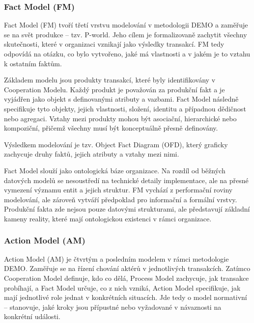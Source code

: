 
\subsubsection{Fact Model (FM)}
\label{sec:fact-model}

Fact Model (FM) tvoří třetí vrstvu modelování v metodologii DEMO a zaměřuje se na svět produkce – tzv. P-world. Jeho cílem je formalizovaně zachytit všechny skutečnosti, které v organizaci vznikají jako výsledky transakcí. FM tedy odpovídá na otázku, co bylo vytvořeno, jaké má vlastnosti a v jakém je to vztahu k ostatním faktům. \cite{Dietz2020}

Základem modelu jsou produkty transakcí, které byly identifikovány v Cooperation Modelu. Každý produkt je považován za produkční fakt a je vyjádřen jako objekt s definovanými atributy a vazbami. Fact Model následně specifikuje tyto objekty, jejich vlastnosti, složení, identitu a případnou dědičnost nebo agregaci. Vztahy mezi produkty mohou být asociační, hierarchické nebo kompoziční, přičemž všechny musí být konceptuálně přesně definovány. \cite{Dietz1999,Dietz2020}

Výsledkem modelování je tzv. Object Fact Diagram (OFD), který graficky zachycuje druhy faktů, jejich atributy a vztahy mezi nimi. \cite{Pergl2023DEMO_modely}

Fact Model slouží jako ontologická báze organizace. Na rozdíl od běžných datových modelů se nesoustředí na technické detaily implementace, ale na přesné vymezení významu entit a jejich struktur. FM vychází z performační roviny modelování, ale zároveň vytváří předpoklad pro informační a formální vrstvy. Produkční fakta zde nejsou pouze datovými strukturami, ale představují základní kameny reality, které mají ontologickou existenci v rámci organizace. \cite{Dietz1999}


\subsubsection{Action Model (AM)}
\label{sec:action-model}

Action Model (AM) je čtvrtým a posledním modelem v rámci metodologie DEMO. Zaměřuje se na řízení chování aktérů v jednotlivých transakcích. Zatímco Cooperation Model definuje, kdo co dělá, Process Model zachycuje, jak transakce probíhají, a Fact Model určuje, co z nich vzniká, Action Model specifikuje, jak mají jednotlivé role jednat v konkrétních situacích. Jde tedy o model normativní – stanovuje, jaké kroky jsou přípustné nebo vyžadované v návaznosti na konkrétní události. \cite{Pergl2023DEMO_modely,Dietz2020}

